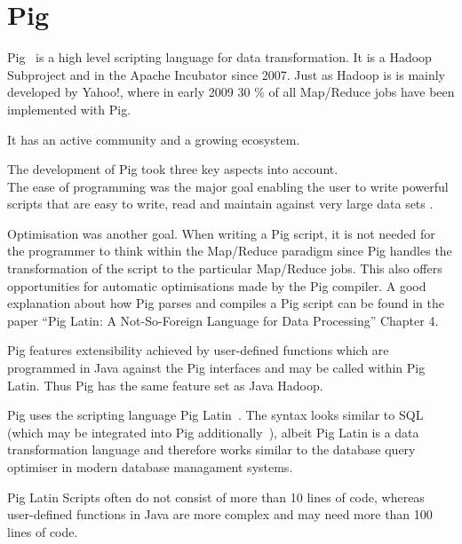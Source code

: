\section{Pig}

Pig~\cite{pigWebsite}  is a high level scripting language for data transformation. It is a Hadoop Subproject and in the Apache Incubator since 2007. Just as Hadoop is is mainly developed by Yahoo!, where in early 2009 30 \% of all Map/Reduce jobs have been implemented with Pig.~\cite{pig30percent}

It has an active community and a growing ecosystem.

The development of Pig took three key aspects into account. \\
The ease of programming was the major goal enabling the user to write powerful scripts that are easy to write, read and maintain against very large data sets .~\cite{pigWebsite}

Optimisation was another goal. When writing a Pig script, it is not needed for the programmer to think within the Map/Reduce paradigm since Pig handles the transformation of the script to the particular Map/Reduce jobs. This also offers opportunities for automatic optimisations made by the Pig compiler. A good explanation about how Pig parses and compiles a Pig script can be found in the paper ``Pig Latin: A Not-So-Foreign Language for Data Processing'' Chapter 4.~\cite{pigNotForeign}

Pig features extensibility achieved by user-defined functions which are programmed in Java against the Pig interfaces and may be called within Pig Latin. Thus Pig has the same feature set as Java Hadoop.

Pig uses the scripting language Pig Latin~\cite{pigManual}. The syntax looks similar to SQL (which may be integrated into Pig additionally~\cite{pigSql}), albeit Pig Latin is a data transformation language and therefore works similar to the database query optimiser in modern database managament systems.

Pig Latin Scripts often do not consist of more than 10 lines of code, whereas user-defined functions in Java are more complex and may need more than 100 lines of code.
                                                                                                               